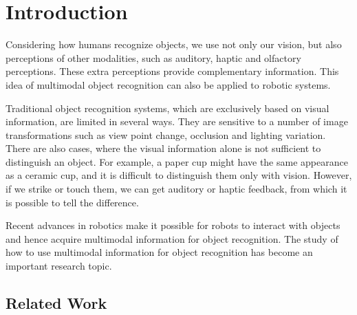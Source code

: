 \documentclass[12pt,final,twoside]{report}
\begin{document}

\cleardoublepage

\setcounter{tocdepth}{1}               %
\tableofcontents
\cleardoublepage
\listoffigures
\cleardoublepage
{}
\listoftables
\cleardoublepage

\fancyhead[LE]{\it \leftmark}           %
\fancyhead[RO]{\it \rightmark}          %
\fancyhead[LO,RE]{}                     %


\chapter{Introduction}
Considering how humans recognize objects, we use not only our vision, but also perceptions of other modalities, such as auditory, haptic and olfactory perceptions. These extra perceptions provide complementary information. This idea of multimodal object recognition can also be applied to robotic systems.

Traditional object recognition systems, which are exclusively based on visual information, are limited in several ways. They are sensitive to a number of image transformations such as view point change, occlusion and lighting variation. There are also cases, where the visual information alone is not sufficient to distinguish an object. For example, a paper cup might have the same appearance as a ceramic cup, and it is difficult to distinguish them only with vision. However, if we strike or touch them, we can get auditory or haptic feedback, from which it is possible to tell the difference.

Recent advances in robotics make it possible for robots to interact with objects and hence acquire multimodal information for object recognition. The study of how to use multimodal information for object recognition has become an important research topic.

\section{Related Work}
\end{document}
